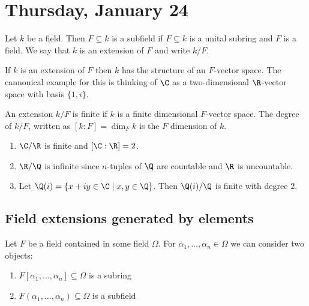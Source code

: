 
\section{Thursday, January 24}

\begin{definition}[Extension]
Let $k$ be a field. Then $F \subseteq k$ is a subfield if $F \subseteq k$ is a unital subring and $F$ is a field.
We say that $k$ is an extension of $F$ and write $k/F$.
\end{definition}

\begin{example}
If $k$ is an extension of $F$ then $k$ has the structure of an $F$-vector space. The cannonical example for this is thinking of $\C$ as a two-dimensional $\R$-vector space with basis $\{1, i\}$.
\end{example}

\begin{definition}
An extension $k/F$ is finite if $k$ is a finite dimensional $F$-vector space. The degree of $k/F$, written as $[k : F] = \dim_Fk$ is the $F$ dimension of $k$.
\end{definition}

\begin{example}
\begin{enumerate}
\item $\C/\R$ is finite and $[\C : \R] = 2$.
\item $\R/\Q$ is infinite since $n$-tuples of $\Q$ are countable and $\R$ is uncountable.
\item Let $\Q(i) = \{x + iy \in \C \mid x,y \in \Q\}$. Then $\Q(i)/\Q$ is finite with degree $2$.
\end{enumerate}
\end{example}

\subsection{Field extensions generated by elements}

Let $F$ be a field contained in some field $\Omega$. For $\alpha_1, \dotsc, \alpha_n \in \Omega$ we can consider two objects:
\begin{enumerate}
\item $F[\alpha_1, \dotsc, \alpha_n] \subseteq \Omega$ is a subring
\item $F(\alpha_1, \dotsc, \alpha_n) \subseteq \Omega$ is a subfield
\end{enumerate}

